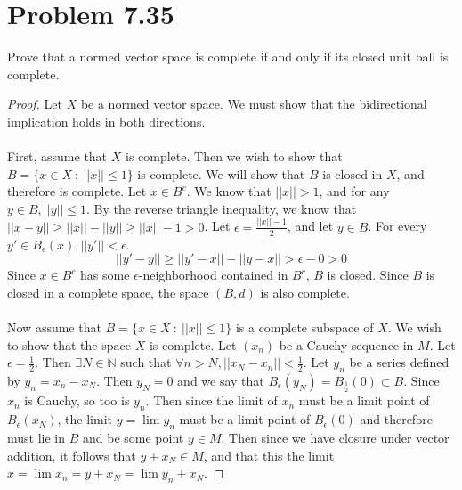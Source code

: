 \documentclass{article}
\theoremstyle{definition}
\begin{document}
    \section*{Problem 7.35}
        Prove that a normed vector space is complete if and only if its closed unit ball is complete.
        \begin{proof}
            Let $X$ be a normed vector space. We must show that the bidirectional implication holds in both directions. \\\\
            \fbox{$\Rightarrow$}
            First, assume that $X$ is complete. Then we wish to show that $B=\{x \in X \ : \ ||x|| \leq 1 \}$ is complete. We will show that $B$ is closed in $X$,
            and therefore is complete. Let $x \in B^c$. We know that $||x|| > 1$, and for any $y \in B, ||y|| \leq 1$. By the reverse triangle inequality, we know that
            $||x-y|| \geq ||x||-||y|| \geq ||x|| - 1 > 0$. Let $\epsilon = \frac{||x|| - 1}{2}$, and let $y \in B$. For every $y' \in B_\epsilon(x), ||y'|| < \epsilon$.
            \[
                ||y'-y|| \geq ||y' - x|| - ||y - x|| > \epsilon - 0 > 0
            \]
            Since $x \in B^c$ has some $\epsilon$-neighborhood contained in $B^c$, $B$ is closed. Since $B$ is closed in a complete space, the space $(B,d)$ is also complete.
            \\\\
            \fbox{$\Leftarrow$} Now assume that $B = \{x \in X \ : \ ||x|| \leq 1\}$ is a complete subspace of $X$. We wish to show that the space $X$ is complete. Let $(x_n)$ be
            a Cauchy sequence in $M$. Let $\epsilon = \frac{1}{2}$. Then $\exists N \in \mathbb{N}$ such that $\forall n > N, ||x_N - x_n|| < \frac{1}{2}$. Let $y_n$ be a series defined by
            $y_n = x_n - x_N$. Then $y_N = 0$ and we say that $B_\epsilon(y_N) = B_{\frac{1}{2}}(0)\subset B$. Since $x_n$ is Cauchy, so too is $y_n$. Then since the limit of $x_n$ must be a limit point of $B_\epsilon(x_N)$, the limit $y = \lim y_n$
            must be a limit point of $B_\epsilon(0)$ and therefore must lie in $B$ and be some point $y \in M$. Then since we have closure under vector addition, it follows that $y + x_N \in M$, and that this the limit $x = \lim x_n = y + x_N = \lim y_n + x_N$.
        \end{proof}
\end{document}
